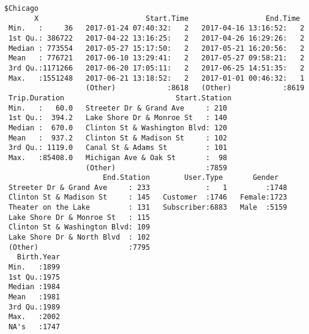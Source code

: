 \documentclass[11pt]{article}
\begin{document}
    
    \begin{verbatim}
$Chicago
       X                         Start.Time                  End.Time   
 Min.   :     36   2017-01-24 07:40:32:   2   2017-04-16 13:16:52:   2  
 1st Qu.: 386722   2017-04-22 13:16:25:   2   2017-04-26 16:29:26:   2  
 Median : 773554   2017-05-27 15:17:50:   2   2017-05-21 16:20:56:   2  
 Mean   : 776721   2017-06-10 13:29:41:   2   2017-05-27 09:58:21:   2  
 3rd Qu.:1171266   2017-06-20 17:05:11:   2   2017-06-25 14:51:35:   2  
 Max.   :1551248   2017-06-21 13:18:52:   2   2017-01-01 00:46:32:   1  
                   (Other)            :8618   (Other)            :8619  
 Trip.Duration                          Start.Station 
 Min.   :   60.0   Streeter Dr & Grand Ave     : 210  
 1st Qu.:  394.2   Lake Shore Dr & Monroe St   : 140  
 Median :  670.0   Clinton St & Washington Blvd: 120  
 Mean   :  937.2   Clinton St & Madison St     : 102  
 3rd Qu.: 1119.0   Canal St & Adams St         : 101  
 Max.   :85408.0   Michigan Ave & Oak St       :  98  
                   (Other)                     :7859  
                       End.Station        User.Type       Gender    
 Streeter Dr & Grand Ave     : 233             :   1         :1748  
 Clinton St & Madison St     : 145   Customer  :1746   Female:1723  
 Theater on the Lake         : 131   Subscriber:6883   Male  :5159  
 Lake Shore Dr & Monroe St   : 115                                  
 Clinton St & Washington Blvd: 109                                  
 Lake Shore Dr & North Blvd  : 102                                  
 (Other)                     :7795                                  
   Birth.Year  
 Min.   :1899  
 1st Qu.:1975  
 Median :1984  
 Mean   :1981  
 3rd Qu.:1989  
 Max.   :2002  
 NA's   :1747  


\end{verbatim}
\end{document}
